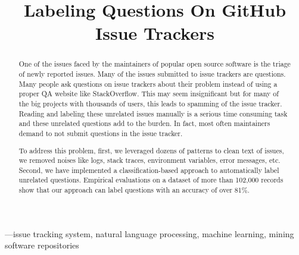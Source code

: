 \documentclass[conference]{IEEEtran}
\begin{document}
\title{Labeling Questions On GitHub Issue Trackers\\
}

\author{
}

\maketitle


\begin{abstract}
  One of the issues faced by the maintainers of popular open source software is the triage 
  of newly reported issues. Many of the issues submitted to issue trackers are questions.
  Many people ask questions on issue trackers about their problem instead of using a proper QA 
  website like StackOverflow. This may seem insignificant but for many of the big projects 
  with thousands of users, this leads to spamming of the issue tracker. Reading and labeling
  these unrelated issues manually is a serious time consuming task and these unrelated questions 
  add to the burden. In fact, most often maintainers demand to not submit questions in the 
  issue tracker.

  To address this problem, first, we leveraged dozens of patterns
  to clean text of issues, we removed noises like logs, stack traces, environment variables, 
  error messages, etc.
  Second, we have implemented a classification-based approach to automatically label unrelated questions. 
  Empirical evaluations on a dataset of more than 102,000 records show that our approach 
  can label questions with an accuracy of over 81\%. 
\end{abstract}  

\begin{IEEEkeywords}
  —issue tracking system, natural language processing, machine learning, mining software repositories
\end{IEEEkeywords}
\end{document}
